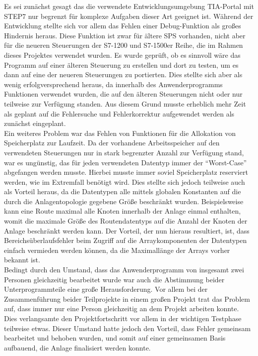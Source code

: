 		Es sei zunächst gesagt das die verwendete Entwicklungsumgebung \ac{TIA-Portal} mit \ac{STEP7} nur begrenzt für komplexe Aufgaben dieser Art geeignet ist. Während der Entwicklung stellte sich vor allem das Fehlen einer Debug-Funktion als großes Hindernis heraus. Diese Funktion ist zwar für ältere \ac{SPS} vorhanden, nicht aber für die neueren Steuerungen der S7-1200 und S7-1500er Reihe, die im Rahmen dieses Projektes verwendet wurden. Es wurde geprüft, ob es sinnvoll wäre das Programm auf einer älteren Steuerung zu erstellen und dort zu testen, um es dann auf eine der neueren Steuerungen zu portierten. Dies stellte sich aber als wenig erfolgversprechend heraus, da innerhalb des Anwenderprogramms Funktionen verwendet wurden, die auf den älteren Steuerungen nicht oder nur teilweise zur Verfügung standen. Aus diesem Grund musste erheblich mehr Zeit als geplant auf die Fehlersuche und Fehlerkorrektur aufgewendet werden als zunächst eingeplant.
		\\[4pt]
		Ein weiteres Problem war das Fehlen von Funktionen für die Allokation von Speicherplatz zur Laufzeit. Da der vorhandene Arbeitsspeicher auf den verwendeten Steuerungen nur in stark begrenzter Anzahl zur Verfügung stand, war es ungünstig, das für jeden verwendeten  Datentyp immer der "`Worst-Case"' abgefangen werden musste. Hierbei musste immer soviel Speicherplatz reserviert werden, wie im Extremfall benötigt wird. Dies stellte sich jedoch teilweise auch als Vorteil heraus, da die Datentypen alle mittels globalen Konstanten auf die durch die Anlagentopologie gegebene Größe beschränkt wurden. Beispielsweise kann eine Route maximal alle Knoten innerhalb der Anlage einmal enthalten, womit die maximale Größe des Routendatentyps auf die Anzahl der Knoten der Anlage beschränkt werden kann. Der Vorteil, der nun hieraus resultiert, ist, dass Bereichsüberlaufsfehler beim Zugriff auf die Arraykomponenten der Datentypen einfach vermieden werden können, da die Maximallänge der Arrays vorher bekannt ist.
		\\[4pt]
		Bedingt durch den Umstand, dass das Anwenderprogramm von insgesamt zwei Personen gleichzeitig bearbeitet wurde war auch die Abstimmung beider Unterprogrammteile eine große Herausforderung. Vor allem bei der Zusammenführung beider Teilprojekte in einem großen Projekt trat das Problem auf, dass immer nur eine Person gleichzeitig an dem Projekt arbeiten konnte. Dies verlangsamte den Projektfortschritt vor allem in der wichtigen Testphase teilweise etwas. Dieser Umstand hatte jedoch den Vorteil, dass Fehler gemeinsam bearbeitet und behoben wurden, und somit auf einer gemeinsamen Basis aufbauend, die Anlage finalisiert werden konnte.
		
